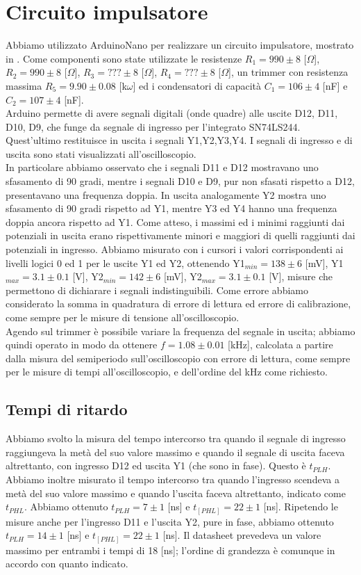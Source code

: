 \section{Circuito impulsatore}
Abbiamo utilizzato ArduinoNano per realizzare un circuito impulsatore, mostrato in . Come componenti sono state utilizzate le resistenze $R_1 = 990 \pm 8$ [$\Omega$], $R_2 = 990 \pm 8$ [$\Omega$], $R_3 = ??? \pm 8$ [$\Omega$], $R_4 = ??? \pm 8$ [$\Omega$], un trimmer con resistenza massima $R_5 = 9.90 \pm 0.08$ [k$\omega$] ed i condensatori di capacità $C_1 = 106 \pm 4$ [nF] e $C_2 = 107 \pm 4$ [nF].\\
Arduino permette di avere segnali digitali (onde quadre) alle uscite D12, D11, D10, D9, che funge da segnale di ingresso per l'integrato SN74LS244. Quest'ultimo restituisce in uscita i segnali Y1,Y2,Y3,Y4. I segnali di ingresso e di uscita sono stati visualizzati all'oscilloscopio.\\
In particolare abbiamo osservato che i segnali D11 e D12 mostravano uno sfasamento di 90 gradi, mentre i segnali D10 e D9, pur non sfasati rispetto a D12, presentavano una frequenza doppia. In uscita analogamente Y2 mostra uno sfasamento di 90 gradi rispetto ad Y1, mentre Y3 ed Y4 hanno una frequenza doppia ancora rispetto ad Y1. Come atteso, i massimi ed i minimi raggiunti dai potenziali in uscita erano rispettivamente minori e maggiori di quelli raggiunti dai potenziali in ingresso. Abbiamo misurato con i cursori i valori corrispondenti ai livelli logici 0 ed 1 per le uscite Y1 ed Y2, ottenendo Y1$_{min} = 138 \pm 6$ [mV], Y1$_{max} = 3.1 \pm 0.1$ [V], Y2$_{min} = 142 \pm 6$ [mV], Y2$_{max} = 3.1 \pm 0.1$ [V], misure che permettono di dichiarare i segnali indistinguibili. Come errore abbiamo considerato la somma in quadratura di errore di lettura ed errore di calibrazione, come sempre per le misure di tensione all'oscilloscopio.\\
Agendo sul trimmer è possibile variare la frequenza del segnale in uscita; abbiamo quindi operato in modo da ottenere $f = 1.08 \pm 0.01$ [kHz], calcolata a partire dalla misura del semiperiodo sull'oscilloscopio con errore di lettura, come sempre per le misure di tempi all'oscilloscopio, e dell'ordine del kHz come richiesto.
\subsection{Tempi di ritardo}
Abbiamo svolto la misura del tempo intercorso tra quando il segnale di ingresso raggiungeva la metà del suo valore massimo e quando il segnale di uscita faceva altrettanto, con ingresso D12 ed uscita Y1 (che sono in fase). Questo è $t_{PLH}$. Abbiamo inoltre misurato il tempo intercorso tra quando l'ingresso scendeva a metà del suo valore massimo e quando l'uscita faceva altrettanto, indicato come $t_{PHL}$. Abbiamo ottenuto $t_{PLH} = 7 \pm 1$ [ns] e $t_[PHL] = 22 \pm 1$ [ns]. Ripetendo le misure anche per l'ingresso D11 e l'uscita Y2, pure in fase, abbiamo ottenuto $t_{PLH} = 14 \pm 1$ [ns] e $t_[PHL] = 22 \pm 1$ [ns]. Il datasheet prevedeva un valore massimo per entrambi i tempi di 18 [ns]; l'ordine di grandezza è comunque in accordo con quanto indicato.
